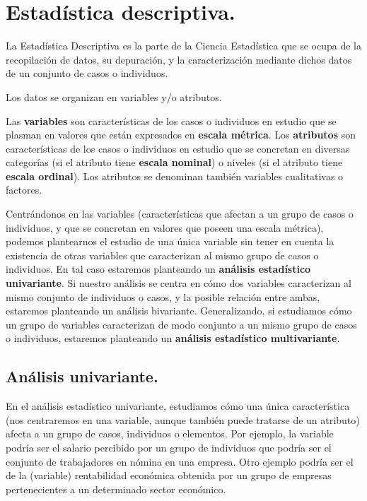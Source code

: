 \documentclass[
]{book}
\begin{document}
\chapter{Estadística descriptiva.}\label{estaduxedstica-descriptiva.}

La Estadística Descriptiva es la parte de la Ciencia Estadística que se ocupa de la recopilación de datos, su depuración, y la caracterización mediante dichos datos de un conjunto de casos o individuos.

Los datos se organizan en variables y/o atributos.

Las \textbf{variables} son características de los casos o individuos en estudio que se plasman en valores que están expresados en \textbf{escala métrica}.
Los \textbf{atributos} son características de los casos o individuos en estudio que se concretan en diversas categorías (si el atributo tiene \textbf{escala nominal}) o niveles (si el atributo tiene \textbf{escala ordinal}).
Los atributos se denominan también variables cualitativas o factores.

Centrándonos en las variables (características que afectan a un grupo de casos o individuos, y que se concretan en valores que poseen una escala métrica), podemos plantearnos el estudio de una única variable sin tener en cuenta la existencia de otras variables que caracterizan al mismo grupo de casos o individuos.
En tal caso estaremos planteando un \textbf{análisis estadístico univariante}.
Si nuestro análisis se centra en cómo dos variables caracterizan al mismo conjunto de individuos o casos, y la posible relación entre ambas, estaremos planteando un análisis bivariante.
Generalizando, si estudiamos cómo un grupo de variables caracterizan de modo conjunto a un mismo grupo de casos o individuos, estaremos planteando un \textbf{análisis estadístico multivariante}.

\section{Análisis univariante.}\label{anuxe1lisis-univariante.}

En el análisis estadístico univariante, estudiamos cómo una única característica (nos centraremos en una variable, aunque también puede tratarse de un atributo) afecta a un grupo de casos, individuos o elementos.
Por ejemplo, la variable podría ser el salario percibido por un grupo de individuos que podría ser el conjunto de trabajadores en nómina en una empresa.
Otro ejemplo podría ser el de la (variable) rentabilidad económica obtenida por un grupo de empresas pertenecientes a un determinado sector económico.
\end{document}
